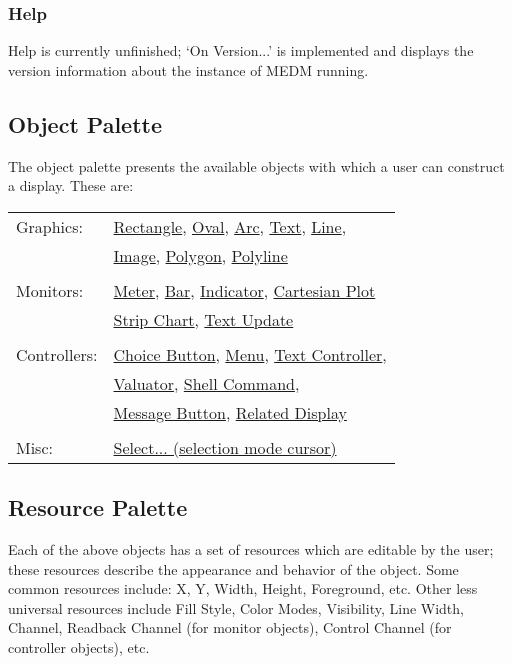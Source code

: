 \subsubsection{Help}

Help is currently unfinished; `On Version...' is implemented and displays
the version information about the instance of MEDM running.

\subsection{Object Palette}

The object palette presents the available objects with which a user can 
construct a display.  These are:\\

\begin{tabular}{ll}
Graphics: & \underline{Rectangle}, \underline{Oval}, \underline{Arc},
	  \underline{Text}, \underline{Line},\\
	  & \underline{Image}, \underline{Polygon}, \underline{Polyline}\\
\\
Monitors: & \underline{Meter}, \underline{Bar}, \underline{Indicator},
\underline{Cartesian Plot}\\
	  &  \underline{Strip Chart}, \underline{Text Update}\\
\\
Controllers: & \underline{Choice Button}, \underline{Menu},
\underline{Text Controller}, \\
	 & \underline{Valuator}, \underline{Shell Command},\\
	 &  \underline{Message Button}, \underline{Related Display}\\
\\
Misc: & \underline{Select... (selection mode cursor)}\\
\end{tabular}


\subsection{Resource Palette}

Each of the above objects has a set of resources which are editable
by the user; these resources describe the appearance and behavior of
the object.  Some common resources include: X, Y, Width, Height,
Foreground, etc.  Other less universal resources include Fill Style,
Color Modes, Visibility, Line Width, Channel, Readback Channel (for
monitor objects), Control Channel (for controller objects), etc. \\

